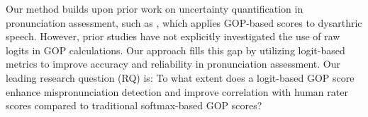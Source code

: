\documentclass{Interspeech}
\begin{document}
Our method builds upon prior work on uncertainty quantification in pronunciation assessment, such as \cite{yeo2023speech}, which applies GOP-based scores to dysarthric speech. However, prior studies have not explicitly investigated the use of raw logits in GOP calculations. Our approach fills this gap by utilizing logit-based metrics to improve accuracy and reliability in pronunciation assessment.
Our leading research question (RQ) is: To what extent does a logit-based GOP score enhance mispronunciation detection and improve correlation with human rater scores compared to traditional softmax-based GOP scores?
\end{document}
